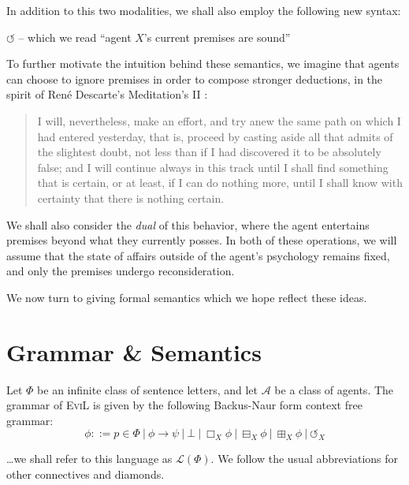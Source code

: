 \documentclass[11pt]{article}
\newcommand{\BB}{\boxminus}
\newcommand{\BBI}{\boxplus}
\begin{document}
In addition to this two modalities, we shall also employ the following new syntax:

\begin{bul}
\item $\circlearrowleft$ -- which we read ``agent $X$'s current premises are sound''
\end{bul}

To further motivate the intuition behind these semantics, we imagine that agents can choose to ignore premises in order to compose stronger deductions, in the spirit of Ren\'{e} Descarte's Meditation's II \citep{descartes1993mfp}:
\begin{quote}
I will, nevertheless, make an effort, and try anew the same path on which I had entered yesterday, that is, proceed by casting aside all that admits of the slightest doubt, not less than if I had discovered it to be absolutely false; and I will continue always in this track until I shall find something that is certain, or at least, if I can do nothing more, until I shall know with certainty that there is nothing certain.\end{quote}

We shall also consider the \emph{dual} of this behavior, where the agent entertains premises beyond what they currently posses. In both of these operations, we will assume that the state of affairs outside of the agent's psychology remains fixed, and only the premises undergo reconsideration.
 
 We now turn to giving formal semantics which we hope reflect these ideas.

\section{Grammar \& Semantics}

Let $\Phi$ be an infinite class of sentence letters, and let $\mathcal{A}$ be a class of agents.  The grammar of \textsc{EviL} is given by the following Backus-Naur form context free grammar:
\[ \phi ::= p \in \Phi\ |\ \phi \to \psi\ |\ \bot \ |\ \Box_X \phi \ | \ \BB_X \phi \ | \ \BBI_X \phi \ | \ \circlearrowleft_X \]

\ldots we shall refer to this language as $\mathcal{L}(\Phi)$.  We follow the usual abbreviations for other connectives and diamonds.
\end{document}
